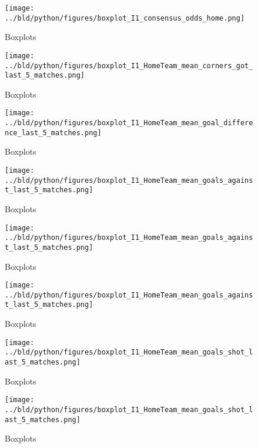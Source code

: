 \documentclass[11pt, a4paper, leqno]{article}
\begin{document}
\begin{figure}[H]
    \centering
    \texttt{[image: ../bld/python/figures/boxplot\_I1\_consensus\_odds\_home.png]}
    \caption{Boxplots}
    \label{fig:figure2}
\end{figure}

\begin{figure}[H]
    \centering
    \texttt{[image: ../bld/python/figures/boxplot\_I1\_HomeTeam\_mean\_corners\_got\_last\_5\_matches.png]}
    \caption{Boxplots}
    \label{fig:figure2}
\end{figure}

\begin{figure}[H]
    \centering
    \texttt{[image: ../bld/python/figures/boxplot\_I1\_HomeTeam\_mean\_goal\_difference\_last\_5\_matches.png]}
    \caption{Boxplots}
    \label{fig:figure2}
\end{figure}


\begin{figure}[H]
    \centering
    \texttt{[image: ../bld/python/figures/boxplot\_I1\_HomeTeam\_mean\_goals\_against\_last\_5\_matches.png]}
    \caption{Boxplots}
    \label{fig:figure2}
\end{figure}

\begin{figure}[H]
    \centering
    \texttt{[image: ../bld/python/figures/boxplot\_I1\_HomeTeam\_mean\_goals\_against\_last\_5\_matches.png]}
    \caption{Boxplots}
    \label{fig:figure2}
\end{figure}

\begin{figure}[H]
    \centering
    \texttt{[image: ../bld/python/figures/boxplot\_I1\_HomeTeam\_mean\_goals\_against\_last\_5\_matches.png]}
    \caption{Boxplots}
    \label{fig:figure2}
\end{figure}


\begin{figure}[H]
    \centering
    \texttt{[image: ../bld/python/figures/boxplot\_I1\_HomeTeam\_mean\_goals\_shot\_last\_5\_matches.png]}
    \caption{Boxplots}
    \label{fig:figure2}
\end{figure}

\begin{figure}[H]
    \centering
    \texttt{[image: ../bld/python/figures/boxplot\_I1\_HomeTeam\_mean\_goals\_shot\_last\_5\_matches.png]}
    \caption{Boxplots}
    \label{fig:figure2}
\end{figure}
\end{document}
